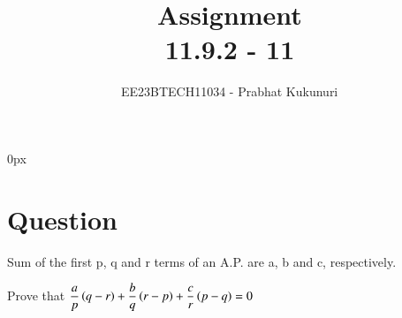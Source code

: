 \documentclass[journal,12pt,twocolumn]{IEEEtran}
\theoremstyle{remark}
\begin{document}
\parindent 0px


\vspace{3cm}

\title{Assignment\\[1ex]11.9.2 - 11}
\author{EE23BTECH11034 - Prabhat Kukunuri$^{}$%
}
\maketitle
\newpage
\bigskip

\renewcommand{\thefigure}{\theenumi}
\renewcommand{\thetable}{\theenumi}
\section*{Question}
Sum of the first p, q and r terms of an A.P. are a, b and c, respectively.

Prove that $\dfrac{a}{p}\left(q-r\right)+\dfrac{b}{q}\left(r-p\right)+\dfrac{c}{r}\left(p-q\right)=0$
\end{document}
